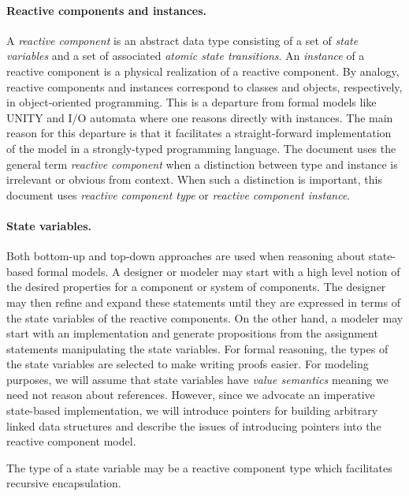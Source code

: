 \paragraph{Reactive components and instances.}
A \emph{reactive component} is an abstract data type consisting of a set of \emph{state variables} and a set of associated \emph{atomic state transitions}.
An \emph{instance} of a reactive component is a physical realization of a reactive component.
By analogy, reactive components and instances correspond to classes and objects, respectively, in object-oriented programming.
This is a departure from formal models like UNITY and I/O automata where one reasons directly with instances.
The main reason for this departure is that it facilitates a straight-forward implementation of the model in a strongly-typed programming language.
The document uses the general term \emph{reactive component} when a distinction between type and instance is irrelevant or obvious from context.
When such a distinction is important, this document uses \emph{reactive component type} or \emph{reactive component instance}.

\paragraph{State variables.}
Both bottom-up and top-down approaches are used when reasoning about state-based formal models.
A designer or modeler may start with a high level notion of the desired properties for a component or system of components.
The designer may then refine and expand these statements until they are expressed in terms of the state variables of the reactive components.
On the other hand, a modeler may start with an implementation and generate propositions from the assignment statements manipulating the state variables.
For formal reasoning, the types of the state variables are selected to make writing proofs easier.
For modeling purposes, we will assume that state variables have \emph{value semantics} meaning we need not reason about references.
However, since we advocate an imperative state-based implementation, we will introduce pointers for building arbitrary linked data structures and describe the issues of introducing pointers into the reactive component model.

The type of a state variable may be a reactive component type which facilitates recursive encapsulation.

